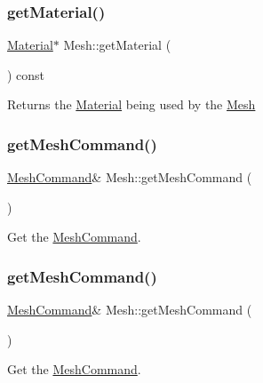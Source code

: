 \subsubsection{\texorpdfstring{get\+Material()}{getMaterial()}\hspace{0.1cm}{\footnotesize\ttfamily [2/2]}}
{\footnotesize\ttfamily \hyperlink{classMaterial}{Material}$\ast$ Mesh\+::get\+Material (\begin{DoxyParamCaption}{ }\end{DoxyParamCaption}) const}

Returns the \hyperlink{classMaterial}{Material} being used by the \hyperlink{classMesh}{Mesh} \mbox{\label{classMesh_a39c778124e07dc3e23613b78e9f717c4}} 
\subsubsection{\texorpdfstring{get\+Mesh\+Command()}{getMeshCommand()}\hspace{0.1cm}{\footnotesize\ttfamily [1/2]}}
{\footnotesize\ttfamily \hyperlink{classMeshCommand}{Mesh\+Command}\& Mesh\+::get\+Mesh\+Command (\begin{DoxyParamCaption}{ }\end{DoxyParamCaption})\hspace{0.3cm}{\ttfamily [inline]}}

Get the \hyperlink{classMeshCommand}{Mesh\+Command}. \mbox{\label{classMesh_a39c778124e07dc3e23613b78e9f717c4}} 
\subsubsection{\texorpdfstring{get\+Mesh\+Command()}{getMeshCommand()}\hspace{0.1cm}{\footnotesize\ttfamily [2/2]}}
{\footnotesize\ttfamily \hyperlink{classMeshCommand}{Mesh\+Command}\& Mesh\+::get\+Mesh\+Command (\begin{DoxyParamCaption}{ }\end{DoxyParamCaption})\hspace{0.3cm}{\ttfamily [inline]}}

Get the \hyperlink{classMeshCommand}{Mesh\+Command}. \mbox{\label{classMesh_abbe2d7d3d9cbefc55576375fdca32ecd}} 
